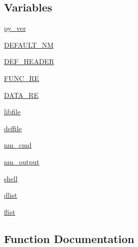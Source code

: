 \subsection*{Variables}
\begin{DoxyCompactItemize}
\item 
\hyperlink{namespacenumpy_1_1distutils_1_1lib2def_a3c47df93e168fb41138c5dc18682f4ee}{py\+\_\+ver}
\item 
\hyperlink{namespacenumpy_1_1distutils_1_1lib2def_a8c25e7827dd8e45318ae3ecf14ed0ab0}{D\+E\+F\+A\+U\+L\+T\+\_\+\+NM}
\item 
\hyperlink{namespacenumpy_1_1distutils_1_1lib2def_a7f6028cc688364de8156400800a13a34}{D\+E\+F\+\_\+\+H\+E\+A\+D\+ER}
\item 
\hyperlink{namespacenumpy_1_1distutils_1_1lib2def_a8342d7161458e1b536e0beacdab09847}{F\+U\+N\+C\+\_\+\+RE}
\item 
\hyperlink{namespacenumpy_1_1distutils_1_1lib2def_a723c30016c86753bbfe3c7cb0f15cc3c}{D\+A\+T\+A\+\_\+\+RE}
\item 
\hyperlink{namespacenumpy_1_1distutils_1_1lib2def_ac684be4d7287a2afac29de5f63dc188c}{libfile}
\item 
\hyperlink{namespacenumpy_1_1distutils_1_1lib2def_a1f106532f9b3b0a52086c20f39dc4111}{deffile}
\item 
\hyperlink{namespacenumpy_1_1distutils_1_1lib2def_a02e08fdc47aabf6e8e913caf6e2f17bc}{nm\+\_\+cmd}
\item 
\hyperlink{namespacenumpy_1_1distutils_1_1lib2def_ab061d718d116dde548ef775b7507ef84}{nm\+\_\+output}
\item 
\hyperlink{namespacenumpy_1_1distutils_1_1lib2def_a9826a216321d2681304aee4789512b70}{shell}
\item 
\hyperlink{namespacenumpy_1_1distutils_1_1lib2def_a002146b7fc15a64b401adef648369357}{dlist}
\item 
\hyperlink{namespacenumpy_1_1distutils_1_1lib2def_a08fd4fe9e0d4800719befffd95ccf65d}{flist}
\end{DoxyCompactItemize}


\subsection{Function Documentation}
\mbox{\label{namespacenumpy_1_1distutils_1_1lib2def_ad1913aa0e63c4f86983cb16894e6d1c0}} 
